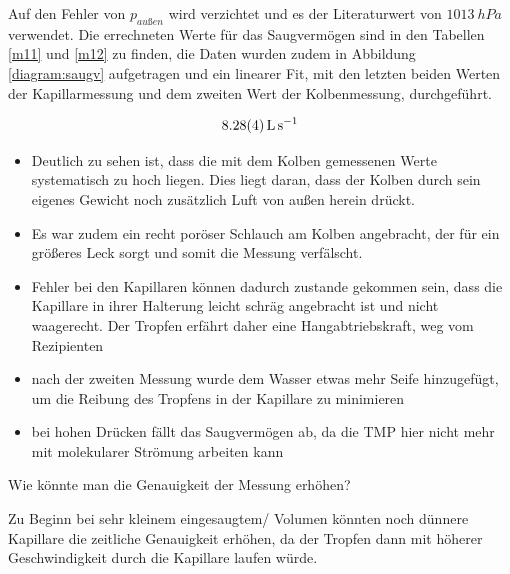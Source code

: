 \documentclass[12pt, a4paper]{scrartcl}
\begin{document}
        Auf den Fehler von $p_{außen}$ wird verzichtet und es der Literaturwert von $1013\ hPa$ verwendet.
        Die errechneten Werte für das Saugvermögen sind in den Tabellen \ref{m11} und \ref{m12}
        zu finden, die Daten wurden zudem in Abbildung
        \ref{diagram:saugv}
        aufgetragen und ein linearer Fit, mit den letzten beiden Werten der Kapillarmessung und dem zweiten Wert der Kolbenmessung, durchgeführt.
        
        \begin{align*}
            \SI{8.28+-0.04}{\litre\per\second}
        \end{align*}
        
        \begin{itemize}
            \item Deutlich zu sehen ist, dass die mit dem Kolben gemessenen Werte systematisch zu hoch liegen. Dies liegt daran, dass der Kolben durch sein eigenes Gewicht noch zusätzlich Luft von außen herein drückt.
            
            \item Es war zudem ein recht poröser Schlauch am Kolben angebracht, der für ein größeres Leck sorgt und somit die Messung verfälscht.
            
            \item Fehler bei den Kapillaren können dadurch zustande gekommen sein, dass die Kapillare in ihrer Halterung leicht schräg angebracht ist und nicht waagerecht. Der Tropfen erf\"ahrt daher eine Hangabtriebskraft, weg vom Rezipienten
            
            \item nach der zweiten Messung wurde dem Wasser etwas mehr Seife hinzugefügt, um die Reibung des Tropfens in der Kapillare zu minimieren
            
            \item bei hohen Dr\"ucken f\"allt das Saugverm\"ogen ab, da die TMP hier nicht mehr mit molekularer Str\"omung arbeiten kann
        \end{itemize}
        Wie könnte man die Genauigkeit der Messung erhöhen?
        
        Zu Beginn bei sehr kleinem eingesaugtem/ Volumen könnten noch dünnere Kapillare die zeitliche Genauigkeit erhöhen, da der Tropfen dann mit höherer Geschwindigkeit durch die Kapillare laufen würde.
        
\end{document}
